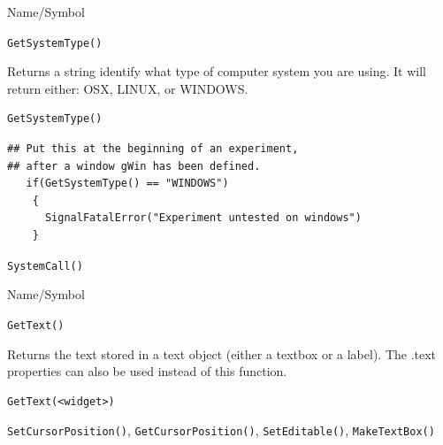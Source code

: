 \begin{desc}{Name/Symbol}
\item[Name/Symbol]	\verb+GetSystemType()+

\item[Description]	Returns a string identify what type of computer system you are using. It will return either: OSX, LINUX, or WINDOWS.

\item[Usage]
\begin{verbatim}
GetSystemType()
\end{verbatim}

\item[Example]

\begin{verbatim}
## Put this at the beginning of an experiment, 
## after a window gWin has been defined.
   if(GetSystemType() == "WINDOWS")
    {
      SignalFatalError("Experiment untested on windows")
    }

\end{verbatim}

\item[See Also]
  \verb+SystemCall()+
\end{desc}



\begin{desc}{Name/Symbol}
\item[Name/Symbol]	\verb+GetText()+

\item[Description]	Returns the text stored in a text object 
		(either a textbox or a label).  The .text properties can also
  be used instead of this function.

\item[Usage]
\begin{verbatim}
GetText(<widget>)
\end{verbatim}

\item[Example]	

\item[See Also]	\verb+SetCursorPosition()+, \verb+GetCursorPosition()+, \verb+SetEditable()+, \verb+MakeTextBox()+
\end{desc}


